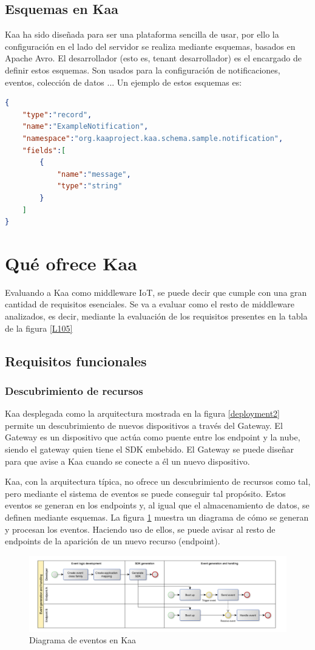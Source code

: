 \documentclass[12pt, twoside]{book}
\begin{document}
\subsection*{Esquemas en Kaa}
Kaa ha sido diseñada para ser una plataforma sencilla de usar, por ello la configuración en el lado del servidor se realiza mediante esquemas, basados en Apache Avro\cite{avro}. El desarrollador (esto es, tenant desarrollador) es el encargado de definir estos esquemas. Son usados para la configuración de notificaciones, eventos, colección de datos ... Un ejemplo de estos esquemas es:
\begin{lstlisting}[language=json]
{ 
    "type":"record",
    "name":"ExampleNotification",
    "namespace":"org.kaaproject.kaa.schema.sample.notification",
    "fields":[ 
        { 
            "name":"message",
            "type":"string"
        }
    ]
}
\end{lstlisting}
\section{Qué ofrece Kaa}
Evaluando a Kaa como middleware IoT, se puede decir que cumple con una gran cantidad de requisitos esenciales. Se va a evaluar como el resto de middleware analizados, es decir, mediante la evaluación de los requisitos presentes en la tabla de la figura \ref{L105} 
 
\subsection{Requisitos funcionales}
\subsubsection*{Descubrimiento de recursos}
Kaa desplegada como la arquitectura mostrada en la figura \ref{deployment2} permite un descubrimiento de nuevos dispositivos a través del Gateway. El Gateway es un dispositivo que actúa como puente entre los endpoint y la nube, siendo el gateway quien tiene el SDK embebido. El Gateway se puede diseñar para que avise a Kaa cuando se conecte a él un nuevo dispositivo. 


Kaa, con la arquitectura típica, no ofrece un descubrimiento de recursos como tal, pero mediante el sistema de eventos se puede conseguir tal propósito. Estos eventos se generan en los endpoints y, al igual que el almacenamiento de datos, se definen mediante esquemas. La figura \ref{L506} muestra un diagrama de cómo se generan y procesan los eventos. Haciendo uso de ellos, se puede avisar al resto de endpoints de la aparición de un nuevo recurso (endpoint).
\begin{figure}[H]
\centering
\includegraphics[scale=0.5]{images/events_schema}
\caption{Diagrama de eventos en Kaa}\label{L506}
\end{figure} 
\end{document}
